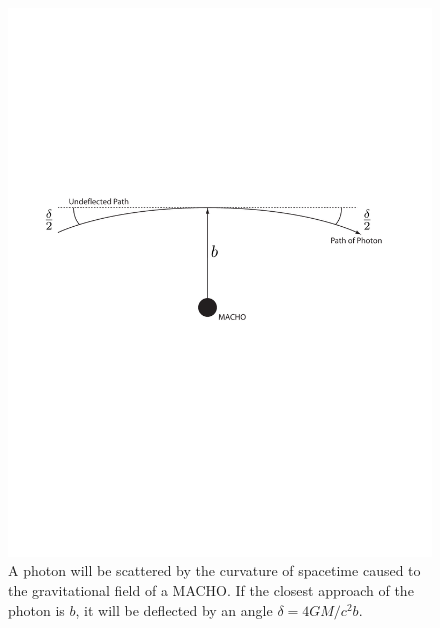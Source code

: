 \begin{figure}[p]
\begin{center}
\includegraphics[width=\linewidth]{figures/macho/scattering}
\end{center}
\caption[Scattering of Light in Schwarzschild Spacetime]{%
\label{f:scattering}
A photon will be scattered by the curvature of spacetime caused to the
gravitational field of a MACHO. If the closest approach of the photon is 
$b$, it will be deflected by an angle $\delta = 4GM / c^2 b$.
}
\end{figure}


